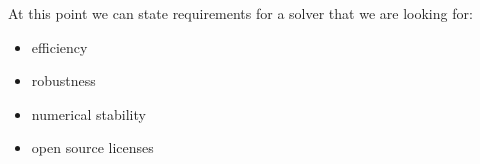 At this point we can state requirements for a solver that we are looking for:

\begin{itemize}
	\item efficiency
	\item robustness
	\item numerical stability
	\item open source licenses
\end{itemize}

